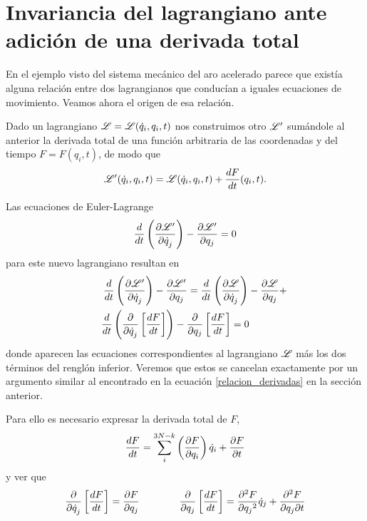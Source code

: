\documentclass[10pt,oneside]{CBFT_book}
\begin{document}
\section{Invariancia del lagrangiano ante adición de una derivada total}


En el ejemplo visto del sistema mecánico del aro acelerado parece que existía alguna relación entre dos 
lagrangianos que conducían a iguales ecuaciones de movimiento. Veamos ahora el origen de esa relación.

Dado un lagrangiano $\Lag = \Lag(\dot{q}_i,q_i,t)$ nos construimos otro $\Lag'$ sumándole al anterior la 
derivada total de una función arbitraria de las coordenadas y del tiempo $F=F(q_i,t)$, de modo que
\[
	\Lag'(\dot{q}_i,q_i,t) = \Lag(\dot{q}_i,q_i,t)+ \dtot{F}{t}(q_i,t) .
\]

Las ecuaciones de Euler-Lagrange 
\[
	\frac{d}{dt}\left(\dpar{\Lag'}{\dot{q}_j}\right) - \dpar{\Lag'}{q_j} = 0
\]
para este nuevo lagrangiano resultan en
\begin{multline}
 	\qquad \frac{d}{dt}\left(\dpar{\Lag'}{\dot{q}_j}\right) - \dpar{\Lag'}{q_j} =
 	\dtot{}{t}\left(\dpar{\Lag}{\dot{q}_j}\right) - \dpar{\Lag}{q_j} + \\
 	\dtot{}{t}\left(\dpar{}{\dot{q}_j}\left[ \dtot{F}{t} \right]\right) 
	- \dpar{}{q_j}\left[ \dtot{F}{t}\right] = 0 \qquad \label{ecEL_lag_suma}	
\end{multline}
donde aparecen las ecuaciones correspondientes al lagrangiano $\Lag$ más los dos términos del 
renglón inferior.
Veremos que estos se cancelan exactamente por un argumento similar al encontrado en la ecuación
\eqref{relacion_derivadas} en la sección anterior.

Para ello es necesario expresar la derivada total de $F$,
\[
	\dtot{F}{t} = \sum_i^{3N-k} \left( \dpar{F}{q_i} \right) \dot{q}_i + \dpar{F}{t}
\]
y ver que
\[
	\dpar{}{\dot{q}_j}\left[ \dtot{F}{t}\right] = \dpar{F}{q_j} \qquad\qquad
	\dpar{}{q_j}\left[ \dtot{F}{t}\right] = \dpar[2]{F}{q_j} \dot{q}_j + \dparcru{F}{t}{q_j} 
\]
\end{document}
